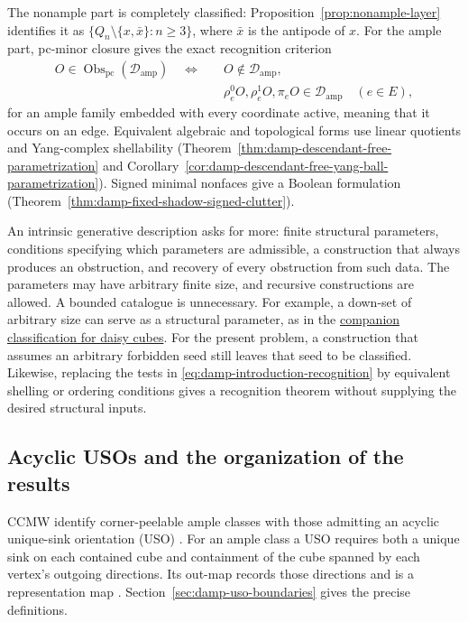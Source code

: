 \documentclass[11pt]{article}
\numberwithin{equation}{section}
\theoremstyle{definition}
\theoremstyle{remark}
\newcommand{\Damp}{\mathcal D_{\mathrm{amp}}}
\newcommand{\Obs}{\operatorname{Obs}_{\mathrm{pc}}}
\begin{document}
The nonample part is completely classified:
Proposition~\ref{prop:nonample-layer} identifies it as
\(\{Q_n\setminus\{x,\bar x\}:n\ge3\}\), where \(\bar x\)
is the antipode of \(x\).  For the ample part, pc-minor closure gives
the exact recognition criterion
\begin{equation}
 \begin{split}
 O\in\Obs(\Damp)\quad\Longleftrightarrow\quad
 &O\notin\Damp,\\[-2pt]
 &\rho_e^0O,\rho_e^1O,\pi_eO\in\Damp
       \quad(e\in E),
 \end{split}
 \label{eq:damp-introduction-recognition}
\end{equation}
for an ample family embedded with every coordinate active, meaning that
it occurs on an edge.
Equivalent algebraic and topological forms use linear quotients and
Yang-complex shellability
(Theorem~\ref{thm:damp-descendant-free-parametrization} and
Corollary~\ref{cor:damp-descendant-free-yang-ball-parametrization}).
Signed minimal nonfaces give a Boolean formulation
(Theorem~\ref{thm:damp-fixed-shadow-signed-clutter}).

An intrinsic generative description asks for more: finite structural
parameters, conditions specifying which parameters are admissible, a
construction that always produces an obstruction, and recovery of every
obstruction from such data.  The parameters may have arbitrary finite
size, and recursive constructions are allowed.  A bounded catalogue is
unnecessary.  For example, a down-set of arbitrary size can serve as a
structural parameter, as in the
\href{daisy_pc_minors.pdf}{companion classification for daisy cubes}.
For the present problem, a construction that assumes an arbitrary
forbidden seed still leaves that seed to be classified.  Likewise,
replacing the tests in \eqref{eq:damp-introduction-recognition} by
equivalent shelling or ordering conditions gives a recognition theorem
without supplying the desired structural inputs.

\subsection{Acyclic USOs and the organization of the results}
\label{sec:damp-intro-uso}

CCMW identify corner-peelable ample classes with those admitting an acyclic
unique-sink orientation (USO) \cite[Proposition~6.12]{ChalopiChepoiMoran22}.
For an ample class a USO requires both a unique sink on each contained cube
and containment of the cube spanned by each vertex's outgoing directions.
Its out-map records those directions and is a representation map
\cite[Theorems~6.1 and~6.8]{ChalopiChepoiMoran22}.
Section~\ref{sec:damp-uso-boundaries} gives the precise definitions.
\end{document}
